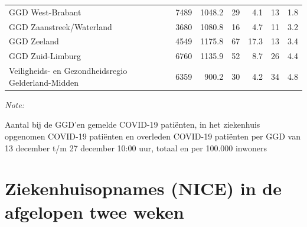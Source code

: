 \documentclass[
  english,
  man,floatsintext]{apa6}
\begin{document}
\begin{table}
\begin{threeparttable}
\begin{tabular}{lrrrrrr}
GGD West-Brabant & 7489 & 1048.2 & 29 & 4.1 & 13 & 1.8\\
GGD Zaanstreek/Waterland & 3680 & 1080.8 & 16 & 4.7 & 11 & 3.2\\
GGD Zeeland & 4549 & 1175.8 & 67 & 17.3 & 13 & 3.4\\
GGD Zuid-Limburg & 6760 & 1135.9 & 52 & 8.7 & 26 & 4.4\\
Veiligheids- en Gezondheidsregio Gelderland-Midden & 6359 & 900.2 & 30 & 4.2 & 34 & 4.8\\
\bottomrule
\end{tabular}
\begin{tablenotes}
\item \textit{Note: } 
\item Aantal bij de GGD’en gemelde COVID-19 patiënten, in het ziekenhuis opgenomen COVID-19 patiënten en overleden COVID-19 patiënten per GGD van 13 december t/m 27 december 10:00 uur, totaal en per 100.000 inwoners
\end{tablenotes}
\end{threeparttable}
\endgroup{}
\end{table}

\newpage

\hypertarget{ziekenhuisopnames-nice-in-de-afgelopen-twee-weken}{%
\section{Ziekenhuisopnames (NICE) in de afgelopen twee weken}\label{ziekenhuisopnames-nice-in-de-afgelopen-twee-weken}}
\end{document}
